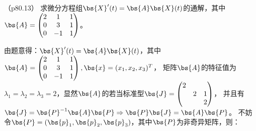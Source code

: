 \documentclass[12pt, a4paper, oneside, UTF8]{ctexbook}
\begin{document}
\begin{question}（p80.13）
    求微分方程组$\bs{X}'(t)=\bs{A}\bs{X}(t)$的通解，其中$\bs{A}=\begin{pmatrix}
        2 &1 &1 \\
        0 & 3 & 1\\
        0 & -1 & 1
    \end{pmatrix}$。
\end{question}


\begin{solution}
    由题意得：$\bs{X}'(t)=\bs{A}\bs{X}(t)$，其中$\bs{A}=\begin{pmatrix}
        2 & 1 & 1\\
        0 &3& 1 \\
        0 & -1 & 1
    \end{pmatrix},\bs{x}=(x_1,x_2,x_3)^T$，
    矩阵$\bs{A}$的特征值为$\lambda_1=\lambda_2=\lambda_3=2$，显然$\bs{A}$的若当标准型$\bs{J}=\begin{pmatrix}
        2 & &\\
        & 2 & 1\\
        & & 2
    \end{pmatrix}$，
    并且有$\bs{J}=\bs{P}^{-1}\bs{A}\bs{P} \Rightarrow \bs{P}\bs{J}=\bs{A}\bs{P}$。
    不妨令$\bs{P}=(\bs{p}_1,\bs{p}_2,\bs{p}_3)$，其中$\bs{P}$为非奇异矩阵，则：


\end{solution}
\end{document}
